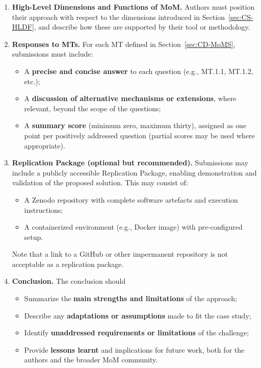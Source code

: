 \documentclass{article}
\begin{document}
\begin{enumerate}[leftmargin=*]
	\item \textbf{High-Level Dimensions and Functions of MoM.}  
   Authors must position their approach with respect to the dimensions
   introduced in Section~\ref{sec:CS-HLDF}, and describe how these are
   supported by their tool or methodology.

	\item \textbf{Responses to MTs.}  
   For each MT defined in Section~\ref{sec:CD-MoMS}, submissions must include:
   \begin{itemize}
      \item A \textbf{precise and concise answer} to each question
      (e.g., MT.1.1, MT.1.2, etc.);
      \item A \textbf{discussion of alternative mechanisms or extensions},
      where relevant, beyond the scope of the questions;
      \item A \textbf{summary score} (minimum zero, maximum thirty), assigned as one point per positively
      addressed question (partial scores may be used where appropriate). 
   \end{itemize}

	\item \textbf{Replication Package (optional but recommended).}  
   Submissions may include a publicly accessible Replication Package,
   enabling demonstration and validation of the proposed solution. This may
   consist of:
   \begin{itemize}
      \item A Zenodo repository with complete software artefacts and execution instructions;
      \item A containerized environment (e.g., Docker image) with pre-configured setup.
   \end{itemize}
   Note that a link to a GitHub or other impermanent repository is not acceptable as a replication package.

	\item \textbf{Conclusion.}  
   The conclusion should
   \begin{itemize}
      \item Summarize the \textbf{main strengths and limitations} of the approach;
      \item Describe any \textbf{adaptations or assumptions} made to fit the case study;
      \item Identify \textbf{unaddressed requirements or limitations} of the challenge;
      \item Provide \textbf{lessons learnt} and implications for future work,
      both for the authors and the broader MoM community.
   \end{itemize}
\end{enumerate}
\end{document}
